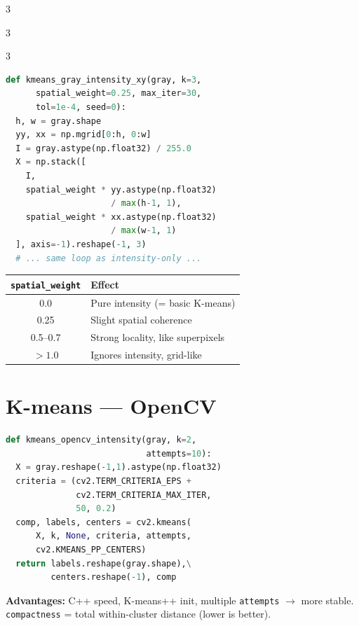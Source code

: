 \documentclass[9pt,landscape,a4paper]{extarticle}
\begin{document}
\begin{multicols*}{3}
\begin{multicols*}{3}
\begin{multicols}{3}
\begin{lstlisting}[language=Python]
def kmeans_gray_intensity_xy(gray, k=3,
      spatial_weight=0.25, max_iter=30,
      tol=1e-4, seed=0):
  h, w = gray.shape
  yy, xx = np.mgrid[0:h, 0:w]
  I = gray.astype(np.float32) / 255.0
  X = np.stack([
    I,
    spatial_weight * yy.astype(np.float32)
                     / max(h-1, 1),
    spatial_weight * xx.astype(np.float32)
                     / max(w-1, 1)
  ], axis=-1).reshape(-1, 3)
  # ... same loop as intensity-only ...
\end{lstlisting}

\begin{center}
\begin{tabular}{@{}cl@{}}
\toprule
\texttt{spatial\_weight} & \textbf{Effect} \\
\midrule
0.0 & Pure intensity (= basic K-means)\\
0.25 & Slight spatial coherence\\
0.5--0.7 & Strong locality, like superpixels\\
$>1.0$ & Ignores intensity, grid-like\\
\bottomrule
\end{tabular}
\end{center}

\section{K-means --- OpenCV}

\begin{lstlisting}[language=Python]
def kmeans_opencv_intensity(gray, k=2,
                            attempts=10):
  X = gray.reshape(-1,1).astype(np.float32)
  criteria = (cv2.TERM_CRITERIA_EPS +
              cv2.TERM_CRITERIA_MAX_ITER,
              50, 0.2)
  comp, labels, centers = cv2.kmeans(
      X, k, None, criteria, attempts,
      cv2.KMEANS_PP_CENTERS)
  return labels.reshape(gray.shape),\
         centers.reshape(-1), comp
\end{lstlisting}

\begin{tipbox}
\textbf{Advantages:} C++ speed, K-means++ init, multiple \texttt{attempts} $\to$ more stable.
\texttt{compactness} = total within-cluster distance (lower is better).
\end{tipbox}


\end{multicols}
\end{multicols*}
\end{multicols*}
\end{document}
